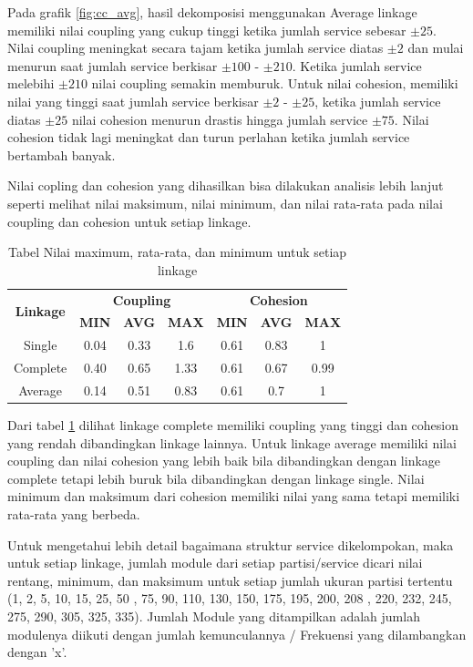 Pada grafik \ref{fig:cc_avg}, hasil dekomposisi menggunakan Average linkage memiliki nilai coupling yang cukup tinggi ketika jumlah service sebesar  $\pm 25$. Nilai coupling meningkat secara tajam ketika jumlah service diatas  $\pm 2$ dan mulai menurun saat jumlah service berkisar  $\pm 100$ - $\pm 210$. Ketika jumlah service melebihi  $\pm 210$ nilai coupling semakin memburuk. Untuk nilai cohesion, memiliki nilai yang tinggi saat jumlah service berkisar  $\pm 2$ -  $\pm 25$, ketika jumlah service diatas  $\pm 25$ nilai cohesion menurun drastis hingga jumlah service  $\pm 75$. Nilai cohesion tidak lagi meningkat dan turun perlahan ketika jumlah service bertambah banyak.

Nilai copling dan cohesion yang dihasilkan bisa dilakukan analisis lebih lanjut seperti melihat nilai maksimum, nilai minimum, dan nilai rata-rata pada nilai coupling dan cohesion untuk setiap linkage.

\begin{table}[ht]
\centering
\begin{tabular}{|c|c|c|c|c|c|c|}
\hline
\multirow{2}{*}{\textbf{Linkage}} & \multicolumn{3}{c|}{\textbf{Coupling}} & \multicolumn{3}{c|}{\textbf{Cohesion}} \\
\cline{2-7}
&  \textbf{MIN} & \textbf{AVG} &  \textbf{MAX} &  \textbf{MIN} &  \textbf{AVG} & \textbf{MAX} \\
\hline
Single & 0.04 & 0.33 & 1.6    & 0.61 & 0.83 & 1 \\
Complete & 0.40 & 0.65 & 1.33 & 0.61 & 0.67 & 0.99 \\
Average & 0.14 & 0.51 & 0.83  & 0.61 & 0.7  & 1 \\
\hline
\end{tabular}
\caption{Tabel  Nilai maximum, rata-rata, dan minimum untuk setiap linkage}
\label{tab:link_stat}
\end{table}

Dari tabel \ref{tab:link_stat} dilihat linkage complete memiliki coupling yang tinggi dan cohesion yang rendah dibandingkan linkage lainnya. Untuk linkage average memiliki nilai coupling dan nilai cohesion yang lebih baik  bila dibandingkan dengan linkage complete tetapi lebih buruk bila dibandingkan dengan linkage single. Nilai  minimum dan maksimum dari cohesion memiliki nilai yang sama tetapi memiliki rata-rata yang berbeda. 

Untuk mengetahui lebih detail bagaimana struktur service dikelompokan, maka untuk setiap linkage, jumlah module dari setiap partisi/service dicari nilai rentang, minimum, dan maksimum untuk setiap jumlah ukuran partisi tertentu (1, 2, 5, 10, 15, 25, 50 , 75, 90, 110, 130, 150, 175, 195, 200, 208 , 220, 232,  245, 275, 290, 305, 325, 335). Jumlah Module yang ditampilkan adalah jumlah modulenya diikuti dengan jumlah kemunculannya / Frekuensi yang dilambangkan dengan 'x'.

